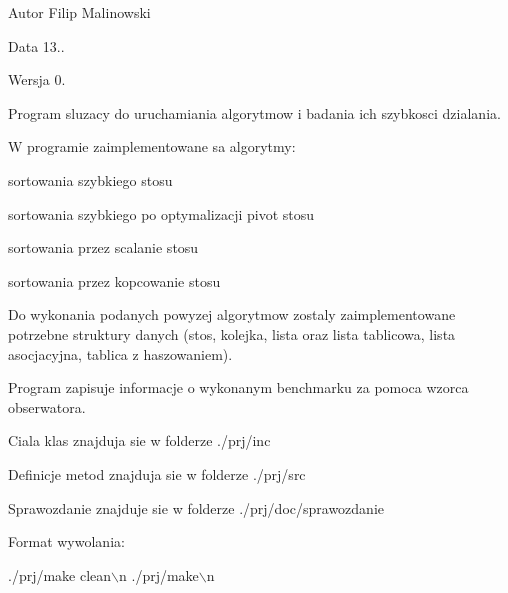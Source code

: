\begin{DoxyAuthor}{Autor}
Filip Malinowski 
\end{DoxyAuthor}
\begin{DoxyDate}{Data}
13.. 
\end{DoxyDate}
\begin{DoxyVersion}{Wersja}
0.
\end{DoxyVersion}
Program sluzacy do uruchamiania algorytmow i badania ich szybkosci dzialania.\par
W programie zaimplementowane sa algorytmy\-:\par

\begin{DoxyItemize}
\item sortowania szybkiego stosu\par

\item sortowania szybkiego po optymalizacji pivot stosu\par

\item sortowania przez scalanie stosu\par

\item sortowania przez kopcowanie stosu
\end{DoxyItemize}

Do wykonania podanych powyzej algorytmow zostaly zaimplementowane potrzebne struktury danych (stos, kolejka, lista oraz lista tablicowa, lista asocjacyjna, tablica z haszowaniem).\par
\par
Program zapisuje informacje o wykonanym benchmarku za pomoca wzorca obserwatora.\par
\par
Ciala klas znajduja sie w folderze ./prj/inc\par
Definicje metod znajduja sie w folderze ./prj/src\par
Sprawozdanie znajduje sie w folderze ./prj/doc/sprawozdanie\par
\par
Format wywolania\-:\par

\begin{DoxyCode}
./prj/make clean\(\backslash\)n
./prj/make\(\backslash\)n
\end{DoxyCode}
 